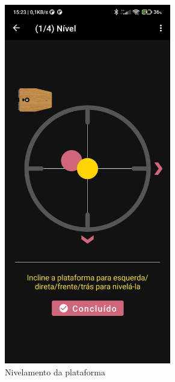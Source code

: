 \begin{figure}[!htb]
	\centering
	\caption{Telas de Alinhamento}
	\label{alinhamento}
	\begin{subfigure}[b]{0.3\textwidth}
		\centering
		\includegraphics[width=0.8\textwidth]{figuras/desAplicativo/nivel}
		\caption{Nivelamento da plataforma}
		\label{menu}
	\end{subfigure}
	\hfill
	\begin{subfigure}[b]{0.3\textwidth}
		\centering

\end{subfigure}
\end{figure}

